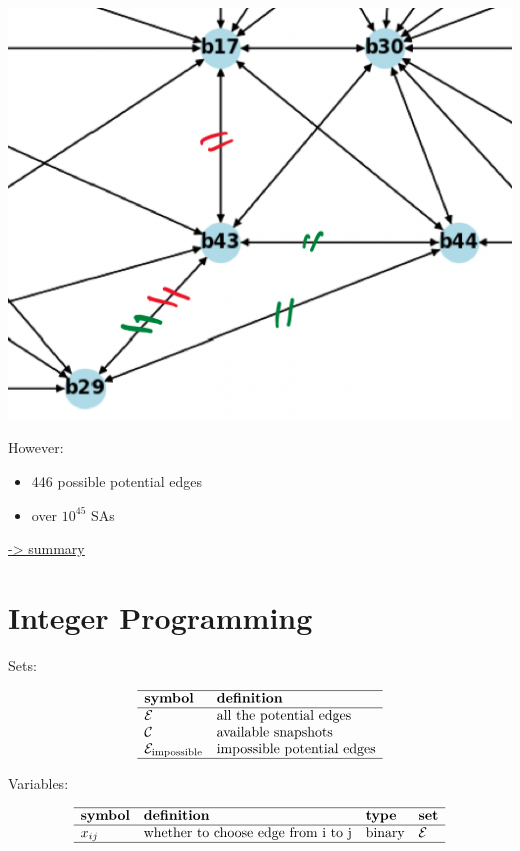 \documentclass[
]{book}
\providecommand{\tightlist}{%
  \setlength{\itemsep}{0pt}\setlength{\parskip}{0pt}}
\begin{document}
\begin{center}\includegraphics[width=0.6\linewidth]{Pictures/overlapGeth} \end{center}

However:

\begin{itemize}
\tightlist
\item
  446 possible potential edges
\item
  over \(10^{45}\) SAs
\end{itemize}

\protect\hyperlink{summary}{-\textgreater{} summary}

\hypertarget{IP}{%
\section{Integer Programming}\label{IP}}

Sets:

\[
\begin{array}{ll}
  \hline
  \textbf{symbol} & \textbf{definition} \\
  \hline
  \mathcal{E}
  & \text{all the potential edges} \\
  \mathcal{C}
  & \text{available snapshots} \\
  \mathcal{E}_\text{impossible}
  & \text{impossible potential edges} \\
  \hline
\end{array}
\]

Variables:

\[
\begin{array}{llll}
  \hline
  \textbf{symbol} & \textbf{definition} & \textbf{type} & \textbf{set} \\
  \hline
  x_{i j} & \text{whether to choose edge from i to j}
  & \text{binary} & \mathcal{E} \\
  \hline
\end{array}
\]
\end{document}
